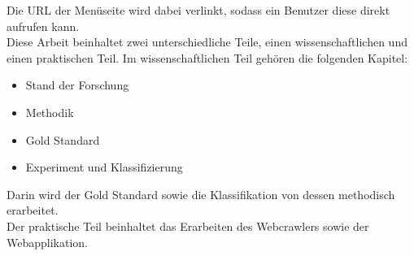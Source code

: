 Die URL der Menüseite wird dabei verlinkt, sodass ein Benutzer diese direkt aufrufen kann.\\
Diese Arbeit beinhaltet zwei unterschiedliche Teile, einen wissenschaftlichen und einen praktischen Teil.
Im wissenschaftlichen Teil gehören die folgenden Kapitel:
\begin{itemize}
	\item Stand der Forschung
	\item Methodik
	\item Gold Standard
	\item Experiment und Klassifizierung
\end{itemize}	
Darin wird der Gold Standard sowie die Klassifikation von dessen methodisch erarbeitet.\\
Der praktische Teil beinhaltet das Erarbeiten des Webcrawlers sowie der Webapplikation.